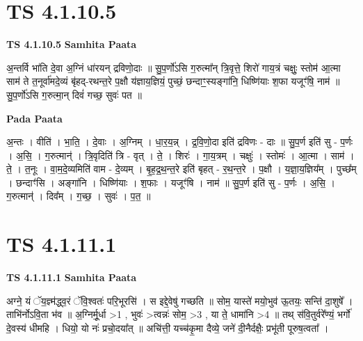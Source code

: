 \documentclass[17pt]{extarticle}
\begin{document}

\section{ TS 4.1.10.5 }

\textbf{TS 4.1.10.5 } \newline
\textbf{Samhita Paata} \newline

अ॒न्तर्वि भा॑ति दे॒वा अ॒ग्निं धा॑रयन् द्रविणो॒दाः ॥ सु॒प॒र्णो॑ऽसि ग॒रुत्मा᳚न् त्रि॒वृत्ते॒ शिरो॑ गाय॒त्रं चक्षुः॒ स्तोम॑ आ॒त्मा साम॑ ते त॒नूर्वा॑मदे॒व्यं बृ॑हद्-रथन्त॒रे प॒क्षौ य॑ज्ञाय॒ज्ञियं॒ पुच्छं॒ छन्दाꣳ॒॒स्यङ्गा॑नि॒ धिष्णि॑याः श॒फा यजूꣳ॑षि॒ नाम॑ ॥ सु॒प॒र्णो॑ऽसि ग॒रुत्मा॒न् दिवं॑ गच्छ॒ सुवः॑ पत ॥ \newline

\textbf{Pada Paata} \newline

अ॒न्तः । वीति॑ । भा॒ति॒ । दे॒वाः । अ॒ग्निम् । धा॒र॒य॒न्न् । द्र॒वि॒णो॒दा इति॑ द्रविणः - दाः ॥ सु॒प॒र्ण इति॑ सु - प॒र्णः । अ॒सि॒ । ग॒रुत्मान्॑ । त्रि॒वृदिति॑ त्रि - वृत् । ते॒ । शिरः॑ । गा॒य॒त्रम् । चक्षुः॑ । स्तोमः॑ । आ॒त्मा । साम॑ । ते॒ । त॒नूः । वा॒म॒दे॒व्यमिति॑ वाम - दे॒व्यम् । बृ॒ह॒द्र॒थ॒न्त॒रे इति॑ बृहत् - र॒थ॒न्त॒रे । प॒क्षौ । य॒ज्ञा॒य॒ज्ञिय᳚म् । पुच्छ᳚म् । छन्दाꣳ॑सि । अङ्गा॑नि । धिष्णि॑याः । श॒फाः । यजूꣳ॑षि । नाम॑ ॥ सु॒प॒र्ण इति॑ सु - प॒र्णः । अ॒सि॒ । ग॒रुत्मान्॑ । दिव᳚म् । ग॒च्छ॒ । सुवः॑ । प॒त॒ ॥  \newline





\section{ TS 4.1.11.1 }

\textbf{TS 4.1.11.1 } \newline
\textbf{Samhita Paata} \newline

अग्ने॒ यं ॅय॒ज्ञ्म॑द्ध्व॒रं ॅवि॒श्वतः॑ परि॒भूरसि॑ । स इद्दे॒वेषु॑ गच्छति ॥ सोम॒ यास्ते॑ मयो॒भुव॑ ऊ॒तयः॒ सन्ति॑ दा॒शुषे᳚ । ताभि॑र्नोऽवि॒ता भ॑व ॥ अ॒ग्निर्मू॒र्धा >1 , भुवः॑ >त्वन्नः॑ सोम॒ >3 , या ते॒ धामा॑नि >4 ॥ तथ् स॑वि॒तुर्वरे᳚ण्यं॒ भर्गो॑ दे॒वस्य॑ धीमहि । धियो॒ यो नः॑ प्रचो॒दया᳚त् ॥ अचि॑त्ती॒ यच्च॑कृ॒मा दैव्ये॒ जने॑ दी॒नैर्दक्षैः॒ प्रभू॑ती पूरुष॒त्वता᳚ । \newline
\end{document}
